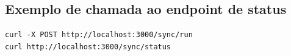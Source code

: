 \documentclass[
	12pt, openright, twoside, a4paper,
	english,
	brazil
	]{abntex2}
\begin{document}
\postextual



\begin{apendicesenv}
\partapendices

\chapter{Exemplo de chamada ao endpoint de status}

\begin{lstlisting}[basicstyle=\small\ttfamily, breaklines=true]
curl -X POST http://localhost:3000/sync/run
curl http://localhost:3000/sync/status
\end{lstlisting}

\end{apendicesenv}
\end{document}
